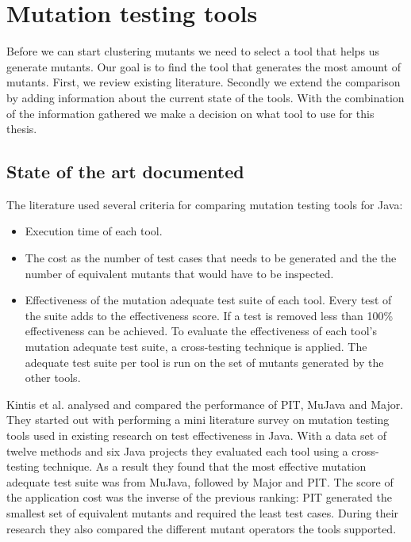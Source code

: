 \documentclass[../main]{subfiles}
\begin{document}
\chapter{Mutation testing tools}
\label{ch:mutation-tool}

Before we can start clustering mutants we need to select a tool that helps us generate mutants. 
Our goal is to find the tool that generates the most amount of mutants. 
\newline
First, we review existing literature. 
Secondly we extend the comparison by adding information about the current state of the tools.
With the combination of the information gathered we make a decision on what tool to use for this thesis.

\section{State of the art documented}
\label{ch:tooling-literature}
The literature used several criteria for comparing mutation testing tools for Java:
\begin{itemize}
  \item Execution time of each tool.
  \item The cost as the number of test cases that needs to be generated and the the number of equivalent mutants that would have to be inspected.
  \item Effectiveness of the mutation adequate test suite of each tool. Every test of the suite adds to the effectiveness score. If a test is removed less than 100\% effectiveness can be achieved. To evaluate the effectiveness of each tool's mutation adequate test suite, a cross-testing technique is applied. The adequate test suite per tool is run on the set of mutants generated by the other tools.
\end{itemize}
Kintis et al. analysed and compared the performance of PIT,  MuJava and Major\cite{Kintis2016AnalysingStudy}. 
They started out with performing a mini literature survey on mutation testing tools used in existing research on test effectiveness in Java. 
With a data set of twelve methods and six Java projects they evaluated each tool using a cross-testing technique.
As a result they found that the most effective mutation adequate test suite was from MuJava, followed by Major and PIT.
The score of the application cost was the inverse of the previous ranking: PIT generated the smallest set of equivalent mutants and required the least test cases.
During their research they also compared the different mutant operators the tools supported. 
\end{document}
